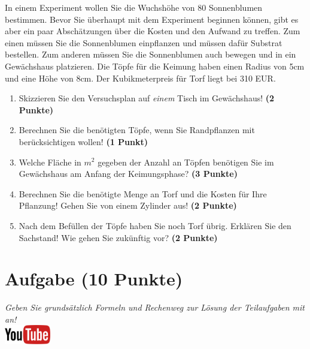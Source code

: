 \documentclass[a4paper, 10pt]{scrartcl}\usepackage[]{graphicx}\usepackage[]{xcolor}
\begin{document}
In einem Experiment wollen Sie die Wuchsh{\"o}he von 80
Sonnenblumen bestimmen. Bevor Sie {\"u}berhaupt mit dem Experiment beginnen
k{\"o}nnen, gibt es aber ein paar Absch{\"a}tzungen {\"u}ber die Kosten und den Aufwand
zu treffen. Zum einen m{\"u}ssen Sie die Sonnenblumen einpflanzen und m{\"u}ssen
daf{\"u}r Substrat bestellen. Zum anderen m{\"u}ssen Sie die Sonnenblumen auch
bewegen und in ein Gew{\"a}chshaus platzieren. Die T{\"o}pfe f{\"u}r die Keimung haben
einen Radius von 5cm und eine H{\"o}he von 8cm. Der
Kubikmeterpreis f{\"u}r Torf liegt bei 310 EUR.

\begin{enumerate}
\item Skizzieren Sie den Versuchsplan auf \textit{einem} Tisch im
  Gew{\"a}chshaus! \textbf{(2 Punkte)}
\item Berechnen Sie die ben{\"o}tigten T{\"o}pfe, wenn Sie Randpflanzen mit
  ber{\"u}cksichtigen wollen! \textbf{(1 Punkt)}
\item Welche Fl{\"a}che in $m^2$ gegeben der Anzahl an T{\"o}pfen ben{\"o}tigen Sie im
  Gew{\"a}chshaus am Anfang der Keimungsphase? \textbf{(3 Punkte)}
\item Berechnen Sie die ben{\"o}tigte Menge an Torf und die Kosten f{\"u}r Ihre
  Pflanzung! Gehen Sie von einem Zylinder aus! \textbf{(2 Punkte)}
\item Nach dem Bef{\"u}llen der T{\"o}pfe haben Sie noch Torf {\"u}brig. Erkl{\"a}ren Sie
  den Sachstand! Wie gehen Sie zuk{\"u}nftig vor? \textbf{(2 Punkte)}
\end{enumerate}


\clearpage\null 
\clearpage

\section{Aufgabe \hfill (10 Punkte)}

\textit{Geben Sie grunds{\"a}tzlich Formeln und Rechenweg zur L{\"o}sung der
  Teilaufgaben mit an!} \\[1Ex]

\hfill\href{https://youtu.be/1B53cVFIU7Q}{\includegraphics[width =
  2cm]{img/youtube}} %
\hspace{2Ex}
\end{document}
